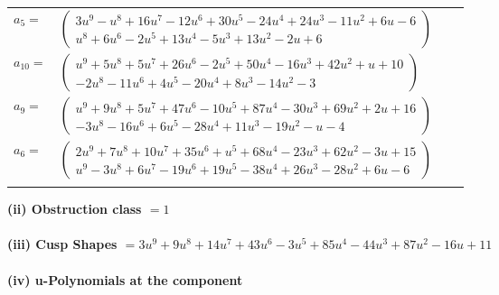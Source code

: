 \documentclass[1p]{elsarticle_modified}
\theoremstyle{definition}
\begin{document}
\begin{tabular}{m{7pt} m{180pt} m{7pt} m{180pt} }
\flushright $a_{5}=$&$\begin{pmatrix}3 u^9- u^8+16 u^7-12 u^6+30 u^5-24 u^4+24 u^3-11 u^2+6 u-6\\u^8+6 u^6-2 u^5+13 u^4-5 u^3+13 u^2-2 u+6\end{pmatrix}$ \\
\flushright $a_{10}=$&$\begin{pmatrix}u^9+5 u^8+5 u^7+26 u^6-2 u^5+50 u^4-16 u^3+42 u^2+u+10\\-2 u^8-11 u^6+4 u^5-20 u^4+8 u^3-14 u^2-3\end{pmatrix}$ \\
\flushright $a_{9}=$&$\begin{pmatrix}u^9+9 u^8+5 u^7+47 u^6-10 u^5+87 u^4-30 u^3+69 u^2+2 u+16\\-3 u^8-16 u^6+6 u^5-28 u^4+11 u^3-19 u^2- u-4\end{pmatrix}$ \\
\flushright $a_{6}=$&$\begin{pmatrix}2 u^9+7 u^8+10 u^7+35 u^6+u^5+68 u^4-23 u^3+62 u^2-3 u+15\\u^9-3 u^8+6 u^7-19 u^6+19 u^5-38 u^4+26 u^3-28 u^2+6 u-6\end{pmatrix}$\\&\end{tabular}
\flushleft \textbf{(ii) Obstruction class $= 1$}\\~\\
\flushleft \textbf{(iii) Cusp Shapes $= 3 u^9+9 u^8+14 u^7+43 u^6-3 u^5+85 u^4-44 u^3+87 u^2-16 u+11$}\\~\\
\newpage\renewcommand{\arraystretch}{1}
\flushleft \textbf{(iv) u-Polynomials at the component}\newline \\
\end{document}

